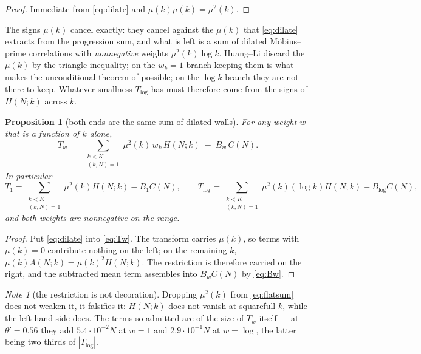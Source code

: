 \documentclass[11pt,a4paper]{article}
\theoremstyle{plain}
\newtheorem{proposition}[theorem]{Proposition}
\theoremstyle{definition}
\theoremstyle{remark}
\newtheorem{note}[theorem]{Note}
\begin{document}
\begin{proof}
Immediate from \eqref{eq:dilate} and $\mu(k)\mu(k)=\mu^2(k)$.
\end{proof}

The signs $\mu(k)$ cancel exactly: they cancel against the $\mu(k)$
that \eqref{eq:dilate} extracts from the progression sum, and what is
left is a sum of dilated M\"obius--prime correlations with
\emph{nonnegative} weights $\mu^2(k)\log k$. Huang--Li discard the
$\mu(k)$ by the triangle inequality; on the $w_k=1$ branch keeping
them is what makes the unconditional theorem of \cite{P1} possible; on
the $\log k$ branch they are not there to keep. Whatever smallness
$T_{\log}$ has must therefore come from the signs of $H(N;k)$ across
$k$.

\begin{proposition}[both ends are the same sum of dilated walls]%
\label{prop:flatsum}
For any weight $w$ that is a function of $k$ alone,
\begin{equation}\label{eq:flatsum}
  T_w\;=\;\sum_{\substack{k<K\\(k,N)=1}}\mu^2(k)\,w_k\,H(N;k)
   \;-\;B_w\,C(N).
\end{equation}
In particular
\[
  T_1=\!\!\sum_{\substack{k<K\\(k,N)=1}}\!\!\mu^2(k)H(N;k)-B_1C(N),
  \qquad
  T_{\log}=\!\!\sum_{\substack{k<K\\(k,N)=1}}\!\!\mu^2(k)(\log k)H(N;k)
   -B_{\log}C(N),
\]
and both weights are nonnegative on the range.
\end{proposition}

\begin{proof}
Put \eqref{eq:dilate} into \eqref{eq:Tw}. The transform carries
$\mu(k)$, so terms with $\mu(k)=0$ contribute nothing on the left; on
the remaining $k$, $\mu(k)A(N;k)=\mu(k)^2H(N;k)$. The restriction is
therefore carried on the right, and the subtracted mean term assembles
into $B_wC(N)$ by \eqref{eq:Bw}.
\end{proof}

\begin{note}[the restriction is not decoration]
Dropping $\mu^2(k)$ from \eqref{eq:flatsum} does not weaken it, it
falsifies it: $H(N;k)$ does not vanish at squarefull $k$, while the
left-hand side does. The terms so admitted are of the size of $T_w$
itself --- at $\theta'=0.56$ they add $5.4\cdot10^{-2}N$ at $w=1$ and
$2.9\cdot10^{-1}N$ at $w=\log$, the latter being two thirds of
$|T_{\log}|$.
\end{note}
\end{document}

